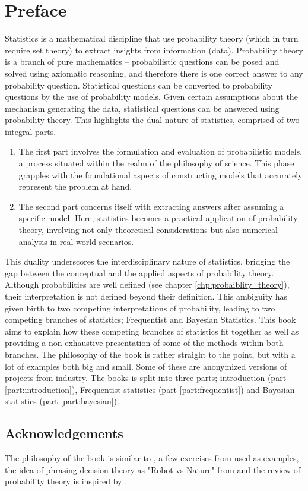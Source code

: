 \chapter{Preface}
\label{chp:preface}
Statistics is a mathematical discipline that use probability theory (which in turn require set theory) to extract insights from information (data). Probability theory is a branch of pure mathematics -- probabilistic questions can be posed and solved using axiomatic reasoning, and therefore there is one correct answer to any probability question. Statistical questions can be converted to probability questions by the use of probability models. Given certain assumptions about the mechanism generating the data, statistical questions can be answered using probability theory. This highlights the dual nature of statistics, comprised of two integral parts.
\begin{enumerate}
	\item The first part involves the formulation and evaluation of probabilistic models, a process situated within the realm of the philosophy of science. This phase grapples with the foundational aspects of constructing models that accurately represent the problem at hand.
	\item The second part concerns itself with extracting answers after assuming a specific model. Here, statistics becomes a practical application of probability theory, involving not only theoretical considerations but also numerical analysis in real-world scenarios.
\end{enumerate}
This duality underscores the interdisciplinary nature of statistics, bridging the gap between the conceptual and the applied aspects of probability theory. Although probabilities are well defined (see chapter \ref{chp:probaiblity_theory}), their interpretation is not defined beyond their definition. This ambiguity has given birth to two competing interpretations of probability, leading to two competing branches of statistics; Frequentist and Bayesian Statistics. This book aims to explain how these competing branches of statistics fit together as well as providing a non-exhaustive presentation of some of the methods within both branches. The philosophy of the book is rather straight to the point, but with a lot of examples both big and small. Some of these are anonymized versions of projects from industry. The books is split into three parts; introduction (part \ref{part:introduction}), Frequentist statistics (part \ref{part:frequentist}) and Bayesian statistics (part \ref{part:bayesian}). 


\section{Acknowledgements}
The philosophy of the book is similar to \cite{Sivia2006}, a few exercises from \cite{murphy2023probabilistic} used as examples, the idea of phrasing decision theory as "Robot vs Nature" from \cite{lavalle2006planning} and the review of probability theory is inspired by \cite{chan2021introduction}.